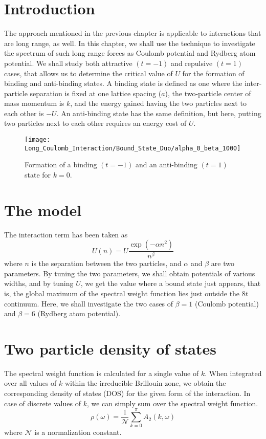 \documentclass[a4paper, 11pt]{report}
\begin{document}
\section{Introduction}
The approach mentioned in the previous chapter is applicable to interactions that are long range, as well. In this chapter, we shall use the technique to investigate the spectrum of such long range forces as Coulomb potential and Rydberg atom potential. We shall study both attractive $(t=-1)$ and repulsive $(t=1)$ cases, that allows us to determine the critical value of $U$ for the formation of binding and anti-binding states. A binding state is defined as one where the inter-particle separation is fixed at one lattice spacing ($a$), the two-particle center of mass momentum is $k$, and the energy gained having the two particles next to each other is $-U$. An anti-binding state has the same definition, but here, putting two particles next to each other requires an energy cost of $U$.

\begin{figure}[h!]
\centering
\texttt{[image: Long\_Coulomb\_Interaction/Bound\_State\_Duo/alpha\_0\_beta\_1000]}
\caption{Formation of a {\color{red}binding $(t=-1)$} and an {\color{blue}anti-binding $(t=1)$} state for $k=0$.}
\label{fig:alpha0beta1000duo}
\end{figure}


\section{The model}
The interaction term has been taken as
\begin{equation}\label{eqn:Long_interaction}
U \left( n \right)  = U \frac{\exp(- \alpha n ^ 2)}{n ^ \beta}
\end{equation}
where $n$ is the separation between the two particles, and $\alpha$ and $\beta$ are two parameters. By tuning the two parameters, we shall obtain potentials of various widths, and by tuning $U$, we get the value where a bound state just appears, that is, the global maximum of the spectral weight function lies just outside the $8t$ continuum. Here, we shall investigate the two cases of $\beta = 1$ (Coulomb potential) and $\beta = 6$ (Rydberg atom potential).

\section{Two particle density of states}
The spectral weight function is calculated for a single value of $k$. When integrated over all values of $k$ within the irreducible Brillouin zone, we obtain the corresponding density of states (DOS) for the given form of the interaction. In case of discrete values of $k$, we can simply sum over the spectral weight function.
\begin{equation}\label{eqn:DOS}
\rho \left( \omega \right) = \frac{1}{\mathcal{N}}\sum_{k = 0}^{\pi} A^{}_{2} \left(k, \omega \right)
\end{equation}
where $\mathcal{N}$ is a normalization constant.
\end{document}
